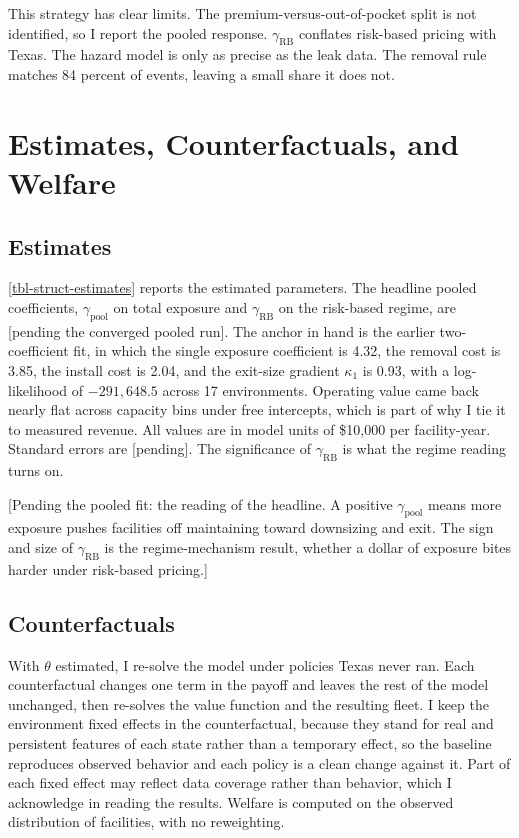 \documentclass[
  12pt,
]{article}
\begin{document}
This strategy has clear limits. The premium-versus-out-of-pocket split
is not identified, so I report the pooled response.
\(\gamma_{\text{RB}}\) conflates risk-based pricing with Texas. The
hazard model is only as precise as the leak data. The removal rule
matches 84 percent of events, leaving a small share it does not.

\section{Estimates, Counterfactuals, and
Welfare}\label{estimates-counterfactuals-and-welfare}

\subsection{Estimates}\label{estimates}

\autoref{tbl-struct-estimates} reports the estimated parameters. The
headline pooled coefficients, \(\gamma_{\text{pool}}\) on total exposure
and \(\gamma_{\text{RB}}\) on the risk-based regime, are {[}pending the
converged pooled run{]}. The anchor in hand is the earlier
two-coefficient fit, in which the single exposure coefficient is 4.32,
the removal cost is 3.85, the install cost is 2.04, and the exit-size
gradient \(\kappa_1\) is 0.93, with a log-likelihood of \(-291{,}648.5\)
across 17 environments. Operating value came back nearly flat across
capacity bins under free intercepts, which is part of why I tie it to
measured revenue. All values are in model units of \$10,000 per
facility-year. Standard errors are {[}pending{]}. The significance of
\(\gamma_{\text{RB}}\) is what the regime reading turns on.

{[}Pending the pooled fit: the reading of the headline. A positive
\(\gamma_{\text{pool}}\) means more exposure pushes facilities off
maintaining toward downsizing and exit. The sign and size of
\(\gamma_{\text{RB}}\) is the regime-mechanism result, whether a dollar
of exposure bites harder under risk-based pricing.{]}

\subsection{Counterfactuals}\label{counterfactuals}

With \(\theta\) estimated, I re-solve the model under policies Texas
never ran. Each counterfactual changes one term in the payoff and leaves
the rest of the model unchanged, then re-solves the value function and
the resulting fleet. I keep the environment fixed effects in the
counterfactual, because they stand for real and persistent features of
each state rather than a temporary effect, so the baseline reproduces
observed behavior and each policy is a clean change against it. Part of
each fixed effect may reflect data coverage rather than behavior, which
I acknowledge in reading the results. Welfare is computed on the
observed distribution of facilities, with no reweighting.
\end{document}
